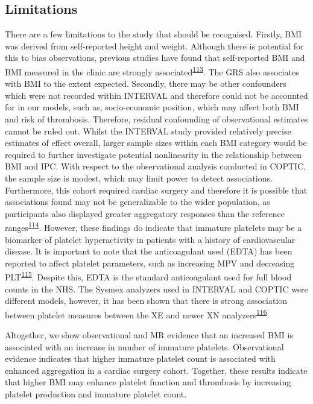 \documentclass[11pt,twoside]{bristolthesis}
\begin{document}
\hypertarget{INTERVAL-limitations}{%
\subsection{Limitations}\label{INTERVAL-limitations}}

There are a few limitations to the study that should be recognised. Firstly, BMI was derived from self-reported height and weight. Although there is potential for this to bias observations, previous studies have found that self-reported BMI and BMI measured in the clinic are strongly associated\textsuperscript{\protect\hyperlink{ref-Nikolaou2017}{113}}. The GRS also associates with BMI to the extent expected. Secondly, there may be other confounders which were not recorded within INTERVAL and therefore could not be accounted for in our models, such as, socio-economic position, which may affect both BMI and risk of thrombosis. Therefore, residual confounding of observational estimates cannot be ruled out. Whilst the INTERVAL study provided relatively precise estimates of effect overall, larger sample sizes within each BMI category would be required to further investigate potential nonlinearity in the relationship between BMI and IPC. With respect to the observational analysis conducted in COPTIC, the sample size is modest, which may limit power to detect associations. Furthermore, this cohort required cardiac surgery and therefore it is possible that associations found may not be generalizable to the wider population, as participants also displayed greater aggregatory responses than the reference ranges\textsuperscript{\protect\hyperlink{ref-Marcucci2015}{114}}. However, these findings do indicate that immature platelets may be a biomarker of platelet hyperactivity in patients with a history of cardiovascular disease. It is important to note that the anticoagulant used (EDTA) has been reported to affect platelet parameters, such as increasing MPV and decreasing PLT\textsuperscript{\protect\hyperlink{ref-Mannuuxdf2020}{115}}. Despite this, EDTA is the standard anticoagulant used for full blood counts in the NHS. The Sysmex analyzers used in INTERVAL and COPTIC were different models, however, it has been shown that there is strong association between platelet measures between the XE and newer XN analyzers\textsuperscript{\protect\hyperlink{ref-Briggs2012}{116}}.

Altogether, we show observational and MR evidence that an increased BMI is associated with an increase in number of immature platelets. Observational evidence indicates that higher immature platelet count is associated with enhanced aggregation in a cardiac surgery cohort. Together, these results indicate that higher BMI may enhance platelet function and thrombosis by increasing platelet production and immature platelet count.
\end{document}
